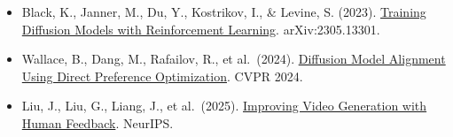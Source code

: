 \vspace{0.25em}
\begin{itemize}
\tightlist
\item
  Black, K., Janner, M., Du, Y., Kostrikov, I., \& Levine, S. (2023). \href{https://arxiv.org/abs/2305.13301}{Training Diffusion Models with Reinforcement Learning}. arXiv:2305.13301.
\item
  Wallace, B., Dang, M., Rafailov, R., et al.~(2024). \href{https://arxiv.org/abs/2311.12908}{Diffusion Model Alignment Using Direct Preference Optimization}. CVPR 2024.
\item
  Liu, J., Liu, G., Liang, J., et al.~(2025). \href{https://arxiv.org/abs/2501.13918}{Improving Video Generation with Human Feedback}. NeurIPS.
\end{itemize}

\clearpage
